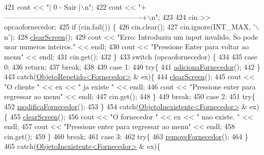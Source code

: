 \begin{DoxyCode}
421     cout << \textcolor{stringliteral}{"| 0 - Sair                                                 |\(\backslash\)n"};
422     cout << \textcolor{stringliteral}{"+----------------------------------------------------------+\(\backslash\)n"};
423 
424     cin >> opcaofornecedor;
425     \textcolor{keywordflow}{if} (cin.fail()) \{
426         cin.clear();
427         cin.ignore(INT\_MAX, \textcolor{charliteral}{'\(\backslash\)n'});
428         \hyperlink{menu_8h_aceb70c1ed7e11f0863a868704f02214b}{clearScreen}();
429         cout << \textcolor{stringliteral}{"Erro: Introduziu um input invalido. So pode usar numeros inteiros."} << endl;
430         cout << \textcolor{stringliteral}{"Pressione Enter para voltar ao menu"} << endl;
431         cin.get();
432     \}
433     \textcolor{keywordflow}{switch} (opcaofornecedor) \{
434 
435     \textcolor{keywordflow}{case} 0:
436         \textcolor{keywordflow}{return};
437         \textcolor{keywordflow}{break};
438 
439     \textcolor{keywordflow}{case} 1:
440         \textcolor{keywordflow}{try}\{
441         \hyperlink{classEmpresa_af20261a3f95a5dd0c4a5a796d9a3d442}{adicionaFornecedor}();
442         \}
443         \textcolor{keywordflow}{catch}(\hyperlink{classObjetoRepetido}{ObjetoRepetido<Fornecedor>} & ex)\{
444             \hyperlink{menu_8h_aceb70c1ed7e11f0863a868704f02214b}{clearScreen}();
445             cout << \textcolor{stringliteral}{"O cliente "} << ex << \textcolor{stringliteral}{" ja existe "} << endl;
446             cout << \textcolor{stringliteral}{"Pressione enter para regressar ao menu"} << endl;
447             cin.get();
448         \}
449         \textcolor{keywordflow}{break};
450     \textcolor{keywordflow}{case} 2:
451         \textcolor{keywordflow}{try}\{
452         \hyperlink{classEmpresa_aa0470e1fd4f41615a230fc8048b8b321}{modificaFornecedor}();
453         \}
454         \textcolor{keywordflow}{catch}(\hyperlink{classObjetoInexistente}{ObjetoInexistente<Fornecedor>} & ex)\{
455             \hyperlink{menu_8h_aceb70c1ed7e11f0863a868704f02214b}{clearScreen}();
456             cout << \textcolor{stringliteral}{"O fornecedor "} << ex << \textcolor{stringliteral}{" nao existe. "} << endl;
457             cout << \textcolor{stringliteral}{"Pressione enter para regressar ao menu"} << endl;
458             cin.get();
459         \}
460         \textcolor{keywordflow}{break};
461     \textcolor{keywordflow}{case} 3:
462         \textcolor{keywordflow}{try}\{
463         \hyperlink{classEmpresa_a9aa7b7e699971eb2e28f0db99c6500c4}{removeFornecedor}();
464         \}
465         \textcolor{keywordflow}{catch}(\hyperlink{classObjetoInexistente}{ObjetoInexistente<Fornecedor>} & ex)\{

\end{DoxyCode}
